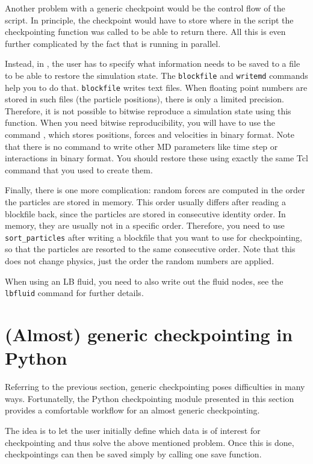 Another problem with a generic checkpoint would be the control flow of
the script. In principle, the checkpoint would have to store where in
the script the checkpointing function was called to be able to return
there.  All this is even further complicated by the fact that \es is
running in parallel.

Instead, in \es, the user has to specify what information needs to be
saved to a file to be able to restore the simulation state.  The
\texttt{blockfile} and \texttt{writemd} commands help you to do that.
\texttt{blockfile} writes text files.  When floating point numbers are
stored in such files (\eg the particle positions), there is only a
limited precision.  Therefore, it is not possible to bitwise reproduce
a simulation state using this function. When you need bitwise
reproducibility, you will have to use the command , which
stores positions, forces and velocities in binary format.  Note that
there is no command to write other MD parameters like time step or
interactions in binary format. You should restore these using exactly
the same Tcl command that you used to create them.

Finally, there is one more complication: random forces are computed
in the order the particles are stored in memory. This order usually
differs after reading a blockfile back, since the particles are
stored in consecutive identity order. In memory, they are usually
not in a specific order. Therefore, you need to use \texttt{sort_particles}
after writing a blockfile that you want to use for checkpointing, so
that the particles are resorted to the same consecutive order. Note
that this does not change physics, just the order the random numbers
are applied.

When using an LB fluid, you need to also write out the fluid nodes,
see the \texttt{lbfluid} command for further details.


\section{(Almost) generic checkpointing in Python}
Referring to the previous section, generic checkpointing poses difficulties 
in many ways. Fortunatelly, the Python checkpointing module presented in 
this section provides a comfortable workflow for an almost generic 
checkpointing.

The idea is to let the user initially define which data is 
of interest for checkpointing and thus solve the above mentioned problem. 
Once this is done, checkpointings can then be saved simply by calling one
save function.

